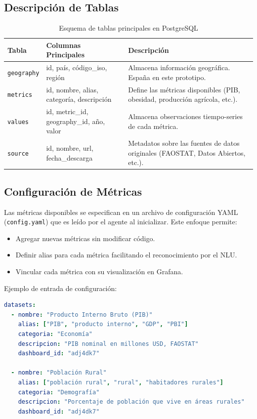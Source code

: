 \documentclass[11pt, a4paper]{report}
\begin{document}
\subsection{Descripción de Tablas}

\begin{table}[H]
\centering
\small
\begin{tabular}{|p{2cm}|p{4cm}|p{8cm}|}
\hline
\textbf{Tabla} & \textbf{Columnas Principales} & \textbf{Descripción} \\
\hline
\texttt{geography} & id, país, código\_iso, región & Almacena información geográfica. España en este prototipo. \\
\hline
\texttt{metrics} & id, nombre, alias, categoría, descripción & Define las métricas disponibles (PIB, obesidad, producción agrícola, etc.). \\
\hline
\texttt{values} & id, metric\_id, geography\_id, año, valor & Almacena observaciones tiempo-series de cada métrica. \\
\hline
\texttt{source} & id, nombre, url, fecha\_descarga & Metadatos sobre las fuentes de datos originales (FAOSTAT, Datos Abiertos, etc.). \\
\hline
\end{tabular}
\caption{Esquema de tablas principales en PostgreSQL}
\label{tab:schema}
\end{table}

\subsection{Configuración de Métricas}

Las métricas disponibles se especifican en un archivo de configuración YAML (\texttt{config.yaml}) que es leído por el agente al inicializar. Este enfoque permite:

\begin{itemize}
    \item Agregar nuevas métricas sin modificar código.
    \item Definir alias para cada métrica facilitando el reconocimiento por el NLU.
    \item Vincular cada métrica con su visualización en Grafana.
\end{itemize}

Ejemplo de entrada de configuración:
\begin{lstlisting}[language=yaml, caption=Extracto de config.yaml]
datasets:
  - nombre: "Producto Interno Bruto (PIB)"
    alias: ["PIB", "producto interno", "GDP", "PBI"]
    categoria: "Economía"
    descripcion: "PIB nominal en millones USD, FAOSTAT"
    dashboard_id: "adj4dk7"
    
  - nombre: "Población Rural"
    alias: ["población rural", "rural", "habitadores rurales"]
    categoria: "Demografía"
    descripcion: "Porcentaje de población que vive en áreas rurales"
    dashboard_id: "adj4dk7"
\end{lstlisting}
\end{document}
